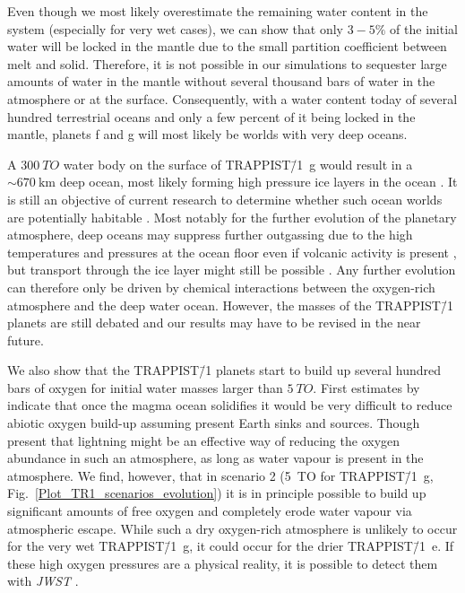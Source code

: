 \documentclass[paper=letterpaper,fontsize=12pt,oneside,twocolumn]{article}
\newcommand{\eg}{e.g. }
\begin{document}
Even though we most likely overestimate the remaining water content in the system (especially for very wet cases), we can show that only $3-5\%$ of the initial water will be locked in the mantle due to the small partition coefficient between melt and solid. Therefore, it is not possible in our simulations to sequester large amounts of water in the mantle without several thousand bars of water in the atmosphere or at the surface. Consequently, with a water content today of several hundred terrestrial oceans and only a few percent of it being locked in the mantle, planets f and g will most likely be worlds with very deep oceans.

A $\SI{300}{TO}$ water body on the surface of TRAPPIST\=/1~g would result in a $\sim \SI{670}{\kilo\metre}$ deep ocean, most likely forming high pressure ice layers in the ocean \citep{Dorn2018}. It is still an objective of current research to determine whether such ocean worlds are potentially habitable \citep[\eg][]{Noack2016}. Most notably for the further evolution of the planetary atmosphere, deep oceans may suppress further outgassing due to the high temperatures and pressures at the ocean floor even if volcanic activity is present \citep{Noack2016}, but transport through the ice layer might still be possible \citep{KalousovaSotin18}. Any further evolution can therefore only be driven by chemical interactions between the oxygen-rich atmosphere and the deep water ocean.
However, the masses of the TRAPPIST\=/1 planets are still debated and our results may have to be revised in the near future.

We also show that the TRAPPIST\=/1 planets start to build up several hundred bars of oxygen for initial water masses larger than $\SI{5}{TO}$. First estimates by \citet{lingam2020} indicate that once the magma ocean solidifies it would be very difficult to reduce abiotic oxygen build-up assuming present Earth sinks and sources. Though \citet{Harman2018} present that lightning might be an effective way of reducing the oxygen abundance in such an atmosphere, as long as water vapour is present in the atmosphere. We find, however, that in scenario 2 (5~TO for TRAPPIST\=/1~g, Fig.~\ref{Plot_TR1_scenarios_evolution}) it is in principle possible to build up significant amounts of free oxygen and completely erode water vapour via atmospheric escape. While such a dry oxygen-rich atmosphere is unlikely to occur for the very wet TRAPPIST\=/1~g, it could occur for the drier TRAPPIST\=/1~e. If these high oxygen pressures are a physical reality, it is possible to detect them with \textit{JWST} \citep{Lincowski2018}.
\end{document}
